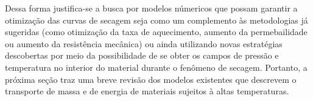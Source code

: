 Dessa forma justifica-se a busca por modelos númericos que possam garantir a
otimização das curvas de secagem seja como um complemento às metodologias já
sugeridas (como otimização da taxa de aquecimento, aumento da permebailidade ou
aumento da resistência mecânica) ou ainda utilizando novas estratégias
descobertas por meio da possibilidade de se obter os campos de pressão e
temperatura no interior do material durante o fenômeno de secagem. Portanto, a
próxima seção traz uma breve revisão dos modelos existentes que descrevem o
transporte de massa e de energia de materiais sujeitos à altas
temperaturas.
     
        
